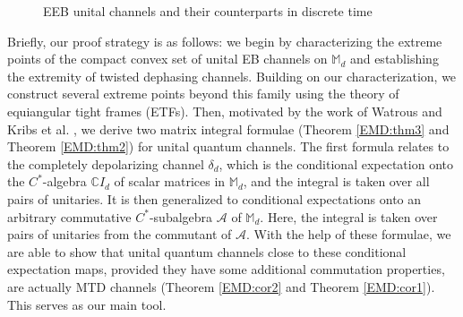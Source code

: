\documentclass[11pt,reqno]{amsart}
\theoremstyle{definition}
\theoremstyle{plain}
\theoremstyle{remark}
\numberwithin{equation}{section}%
\begin{document}
\begin{figure}[htbp]
{
} 
\caption{EEB unital channels and their counterparts in discrete time}\label{discrete_EEB_diagram}
\end{figure}


Briefly, our proof strategy is as follows: we begin by characterizing the extreme points of the compact convex set of unital EB channels on $\mathbb{M}_d$ and establishing the extremity of twisted dephasing channels. Building on our characterization, we construct several extreme points beyond this family using the theory of equiangular tight frames (ETFs). Then, motivated by the work of Watrous \cite{JW2} and Kribs et al. \cite{KLPR}, we derive two matrix integral formulae (Theorem \ref{EMD:thm3} and Theorem \ref{EMD:thm2}) for unital quantum channels. The first formula relates to the completely depolarizing channel $\delta_d$, which is the conditional expectation onto the $C^*$-algebra $\mathbb{C}I_d$ of scalar matrices in $\mathbb{M}_d$, and the integral is taken over all pairs of unitaries.  It is then generalized to conditional expectations onto an arbitrary commutative $C^*$-subalgebra $\mathcal{A}$ of $\mathbb{M}_d.$ Here, the integral is taken over pairs of unitaries from the commutant of $\mathcal{A}.$
With the help of these formulae, we are able to show that unital quantum channels close to these conditional expectation maps, provided they have some additional commutation properties, are actually MTD channels (Theorem \ref{EMD:cor2} and Theorem \ref{EMD:cor1}).  This serves as our main tool.  
\end{document}
